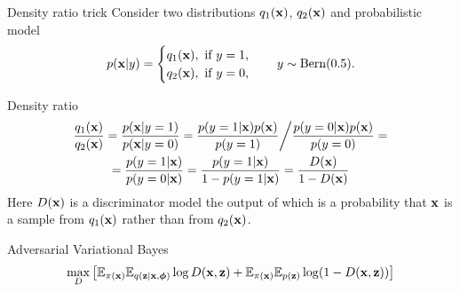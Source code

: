 \begin{frame}{Density ratio trick}
	Consider two distributions $q_1(\mathbf{x})$, $q_2(\mathbf{x})$ and probabilistic model
	\[
		p(\mathbf{x} | y) = \begin{cases}
			q_1(\mathbf{x}), \text{ if } y = 1, \\
			q_2(\mathbf{x}), \text{ if } y = 0,
		\end{cases}
		\quad 
		y \sim \text{Bern}(0.5).
	\]
	\vspace{-0.3cm}
	\begin{block}{Density ratio}
		\vspace{-0.7cm}
		{\small
		\begin{multline*}
			\frac{q_1(\mathbf{x})}{q_2(\mathbf{x})} = \frac{p(\mathbf{x} | y = 1)}{p(\mathbf{x} | y = 0)} = \frac{p(y = 1 | \mathbf{x}) p(\mathbf{x})}{p(y=1)} \bigg/ \frac{p(y = 0 | \mathbf{x}) p(\mathbf{x})}{p(y=0)} = \\
			= \frac{p(y = 1 | \mathbf{x})}{p(y = 0 | \mathbf{x})} = \frac{p(y = 1 | \mathbf{x})}{1 - p(y = 1 | \mathbf{x})} = \frac{D(\mathbf{x})}{1 - D(\mathbf{x})}
		\end{multline*}
		}
		Here $D(\mathbf{x})$ is a discriminator model the output of which is a probability that $\mathbf{x}$ is a sample
		from $q_1(\mathbf{x})$ rather than from $q_2(\mathbf{x})$.
	\end{block}
	\begin{block}{Adversarial Variational Bayes}
		\vspace{-0.6cm}
		\[
			\max_D \left[ \mathbb{E}_{\pi(\mathbf{x})} \mathbb{E}_{q(\mathbf{z} | \mathbf{x}, \boldsymbol{\phi})} \log D(\mathbf{x}, \mathbf{z}) + \mathbb{E}_{\pi(\mathbf{x})} \mathbb{E}_{p(\mathbf{z})} \log (1 - D(\mathbf{x}, \mathbf{z})) \right]
		\]
	\end{block}
\end{frame}
